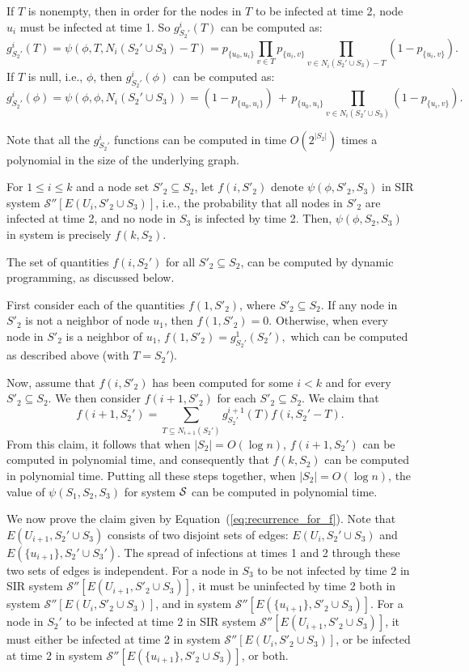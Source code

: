 If $T$ is nonempty, then in order for the nodes in $T$ to be infected at time 2, 
node $u_i$ must be infected at time 1.
So $g^i_{S_2'}(T)$ can be computed as:
\[
g^i_{S_2'}(T) = 
\psi(\phi, T, N_i(S_2' \cup S_3) - T) = 
p_{\{u_0,u_i\}}\prod_{v \in T} p_{\{u_i,v\}} \prod_{v \in N_i(S_2' \cup S_3) - T} (1-p_{\{u_i,v\}}).
\]
If $T$ is null, i.e., $\phi$, then $g^i_{S_2'}(\phi)$ 
can be computed as:
\[
g^i_{S_2'}(\phi) = 
\psi(\phi, \phi, N_i(S_2' \cup S_3)) = ( 1 - p_{ \{u_0,u_i\} }) \, + \,
p_{\{u_0,u_i \}} \prod_{v \in N_i(S_2' \cup S_3)} (1-p_{\{u_i,v\}}).
\]

Note that all the $g^i_{S_2'}$ functions can be computed in time 
$O(2^{|S_2|})$ times a polynomial in the size of the underlying graph.

For $1 \leq i \leq k$ and a node set $S'_2 \subseteq S_2$, let $f(i, S'_2)$ denote
$\psi(\phi, S'_2, S_3)$ in SIR system $\mathcal{S}''[E(U_i, S'_2 \cup S_3)]$,
i.e., the probability that all nodes in $S'_2$ are infected at time 2,
and no node in $S_3$ is infected by time 2.
Then, $\psi(\phi, S_2, S_3)$ 
in system \calspp{} is precisely $f(k, S_2)$.

The set of quantities $f(i, S_2')$ for all $S'_2 \subseteq S_2$,
can be computed by dynamic programming, as discussed below.

First consider each of the quantities $f(1, S'_2)$,
where $S'_2\subseteq S_2$.
If any node in $S'_2$ is not a neighbor of node $u_1$, 
then $f(1, S'_2)=0$. 
Otherwise, when every node in $S'_2$ is a neighbor of $u_1$, 
$f(1, S'_2) = g^1_{S_2'}(S_2'),$
which can be computed as described above (with $T = S_2'$).

Now, assume that $f(i, S'_2)$ has been computed for some $i<k$ and for every $S'_2 \subseteq S_2$.
We then consider $f(i+1, S'_2)$ for each $S'_2 \subseteq S_2$. 
We claim that
\begin{equation} \label{eq:recurrence_for_f}
f(i+1, S_2') = \sum_{T \subseteq N_{i+1}(S_2')} g^{i+1}_{S_2'}(T)f(i, S_2'-T).
\end{equation}
From this claim, it follows that when $|S_2|=O(\log{n})$,
$f(i+1, S_2')$ can be computed in polynomial time,
and consequently  that $f(k, S_2)$ can be computed in polynomial time. 
Putting all these steps together,  
when $|S_2|=O(\log{n})$,
the value of $\psi(S_1, S_2, S_3)$ for system $\mbox{${\cal S}$}{}$
can be computed in polynomial time.

We now prove the claim given by Equation~(\ref{eq:recurrence_for_f}). 
Note that $E(U_{i+1}, S_2' \cup S_3)$ consists of two disjoint sets of edges:
$E(U_i, S_2'  \cup S_3)$ and  $E( \{u_{i+1}\}, S_2' \cup S_3')$.
The spread of infections at times 1 and 2 through these two sets of edges is independent.
For a node in $S_3$ to be not infected by time 2 in SIR system $\mathcal{S}''[E(U_{i+1}, S'_2 \cup S_3)]$,
it must be uninfected by time 2 both in system $\mathcal{S}''[E(U_i, S'_2 \cup S_3)]$,
and in system $\mathcal{S}''[E(\{u_{i+1}\}, S'_2 \cup S_3)]$.
For a node in $S_2'$ to be infected at time 2 in SIR system $\mathcal{S}''[E(U_{i+1}, S'_2 \cup S_3)]$,
it must either be infected at time 2 in system $\mathcal{S}''[E(U_i, S'_2 \cup S_3)]$,
or be infected at time 2 in system $\mathcal{S}''[E(\{u_{i+1}\}, S'_2 \cup S_3)]$, or both.

